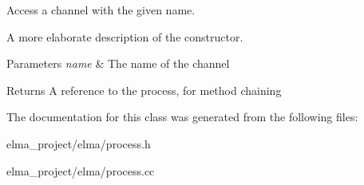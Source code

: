 Access a channel with the given name. 

A more elaborate description of the constructor. 
\begin{DoxyParams}{Parameters}
{\em name} & The name of the channel \\
\hline
\end{DoxyParams}
\begin{DoxyReturn}{Returns}
A reference to the process, for method chaining 
\end{DoxyReturn}


The documentation for this class was generated from the following files\+:\begin{DoxyCompactItemize}
\item 
elma\+\_\+project/elma/process.\+h\item 
elma\+\_\+project/elma/process.\+cc\end{DoxyCompactItemize}
